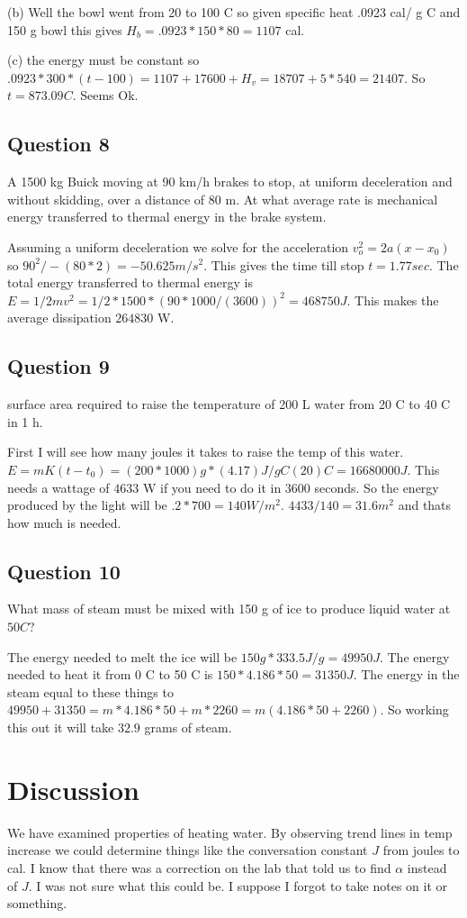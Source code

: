 \documentclass[a4paper,12pt]{article}
\begin{document}
(b) Well the bowl went from 20 to 100 C so given specific heat .0923 cal/ g C and 150 g bowl this gives $H_b = .0923 * 150 * 80 = 1107$ cal.

(c) the energy must be constant so $.0923 * 300 * (t - 100) = 1107 + 17600 + H_v = 18707 + 5 * 540 = 21407$. So $t = 873.09 C$. Seems Ok. 


\subsection{Question 8}
A 1500 kg Buick moving at 90 km/h brakes to stop, at uniform deceleration and without skidding, over a distance of 80 m. At what average rate is mechanical energy transferred to thermal energy in the brake system.

Assuming a uniform deceleration we solve for the acceleration $v_o^2 = 2a(x - x_0)$ so $90^2 / -(80*2) = -50.625 m/s^2$. This gives the time till stop $t = 1.77 sec$. The total energy transferred to thermal energy is $E = 1/2 m v^2 = 1/2 * 1500 * (90 * 1000 / (3600))^2 = 468750 J$. This makes the average dissipation $264830$ W.


\subsection{Question 9}
surface area required to raise the temperature of 200 L water from 20 C to 40 C in 1 h. 

First I will see how many joules it takes to raise the temp of this water. $E = m K (t - t_0) = (200*1000) g * (4.17) J/g C (20) C = 16680000 J$. This needs a wattage of $4633$ W if you need to do it in $3600$ seconds. So the energy produced by the light will be $.2 * 700 = 140 W/m^2$. $4433 / 140 = 31.6 m^2$ and thats how much is needed.

\subsection{Question 10}
What mass of steam must be mixed with 150 g of ice to produce liquid water at $50 C$?

The energy needed to melt the ice will be $150g  *333.5 J/g = 49950 J$. The energy needed to heat it from $0$ C to 50 C is $150 * 4.186 * 50 = 31350 J$. The energy in the steam equal to these things to $49950 + 31350 = m * 4.186 * 50 + m * 2260 = m(4.186 * 50 + 2260)$. So working this out it will take $32.9$ grams of steam.


\section{Discussion}
We have examined properties of heating water. By observing trend lines in temp increase we could determine things like the conversation constant $J$ from joules to cal. I know that there was a correction on the lab that told us to find $\alpha$ instead of $J$. I was not sure what this could be. I suppose I forgot to take notes on it or something.
\end{document}
